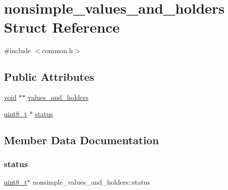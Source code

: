 \hypertarget{structnonsimple__values__and__holders}{}\section{nonsimple\+\_\+values\+\_\+and\+\_\+holders Struct Reference}
\label{structnonsimple__values__and__holders}


{\ttfamily \#include $<$common.\+h$>$}

\subsection*{Public Attributes}
\begin{DoxyCompactItemize}
\item 
\mbox{\hyperlink{_s_d_l__opengles2__gl2ext_8h_ae5d8fa23ad07c48bb609509eae494c95}{void}} $\ast$$\ast$ \mbox{\hyperlink{structnonsimple__values__and__holders_a8d235fb047647ad18ef2b7d36b7c3e1f}{values\+\_\+and\+\_\+holders}}
\item 
\mbox{\hyperlink{_s_d_l__config_8h_aba7bc1797add20fe3efdf37ced1182c5}{uint8\+\_\+t}} $\ast$ \mbox{\hyperlink{structnonsimple__values__and__holders_a6750e4f4c8064a8a2f31d14094d44a53}{status}}
\end{DoxyCompactItemize}


\subsection{Member Data Documentation}
\mbox{\label{structnonsimple__values__and__holders_a6750e4f4c8064a8a2f31d14094d44a53}} 
\subsubsection{\texorpdfstring{status}{status}}
{\footnotesize\ttfamily \mbox{\hyperlink{_s_d_l__config_8h_aba7bc1797add20fe3efdf37ced1182c5}{uint8\+\_\+t}}$\ast$ nonsimple\+\_\+values\+\_\+and\+\_\+holders\+::status}

\mbox{\label{structnonsimple__values__and__holders_a8d235fb047647ad18ef2b7d36b7c3e1f}} 
